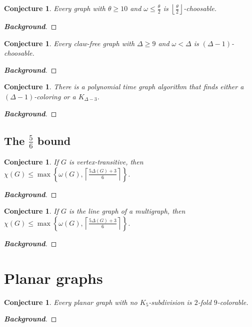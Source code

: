 \documentclass[12pt]{article}
\theoremstyle{plain}
\newtheorem{conjecture}[thm]{Conjecture}
\theoremstyle{definition}
\theoremstyle{remark}
\newcommand{\set}[1]{\left\{ #1 \right\}}
\newcommand{\ceil}[1]{\left\lceil#1\right\rceil}
\newcommand{\floor}[1]{\left\lfloor#1\right\rfloor}
\begin{document}
\begin{conjecture} 
Every graph with $\theta\ge10$ and $\omega\leq\frac{\theta}{2}$ is $\floor{\frac{\theta}{2}}$-choosable. 
\end{conjecture}
\begin{proof}[\textbf{Background}]
\end{proof}

\begin{conjecture}
Every claw-free graph with $\Delta \ge 9$ and $\omega < \Delta$ is $(\Delta-1)$-choosable.
\end{conjecture}
\begin{proof}[\textbf{Background}]
\end{proof}

\begin{conjecture}
There is a polynomial time graph algorithm that finds either a $(\Delta-1)$-coloring or a $K_{\Delta-3}$.
\end{conjecture}
\begin{proof}[\textbf{Background}]
\end{proof}

\subsection{The $\frac56$ bound}
\begin{conjecture}
If $G$ is vertex-transitive, then $\chi(G) \le \max \set{\omega(G), \ceil{\frac{5\Delta(G) + 3}{6}}}$.
\end{conjecture}
\begin{proof}[\textbf{Background}]
\end{proof}

\begin{conjecture}
If $G$ is the line graph of a multigraph, then $\chi(G) \le \max \set{\omega(G), \ceil{\frac{5\Delta(G) + 3}{6}}}$.
\end{conjecture}
\begin{proof}[\textbf{Background}]
\end{proof}

\section{Planar graphs}
\begin{conjecture}
Every planar graph with no $K_5$-subdivision is $2$-fold $9$-colorable.
\end{conjecture}
\begin{proof}[\textbf{Background}]
\end{proof}



\end{document}

